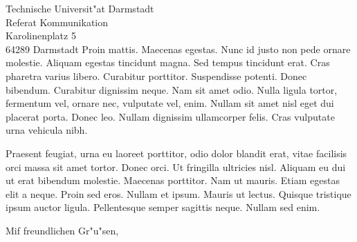 \documentclass[adr=clemens,accentcolor=tud9c,twoside]{tudletter}
\begin{document}
\begin{letter}{%
    Technische Universit"at Darmstadt\\%
    Referat Kommunikation\\%
    Karolinenplatz 5\\%
    64289 Darmstadt}
    Proin mattis. Maecenas egestas. Nunc id justo non pede ornare molestie. Aliquam egestas
    tincidunt magna. Sed tempus tincidunt erat. Cras pharetra varius libero. Curabitur porttitor.
    Suspendisse potenti. Donec bibendum. Curabitur dignissim neque. Nam sit amet odio. Nulla ligula
    tortor, fermentum vel, ornare nec, vulputate vel, enim. Nullam sit amet nisl eget dui placerat
    porta. Donec leo. Nullam dignissim ullamcorper felis. Cras vulputate urna vehicula nibh.
    
    Praesent feugiat, urna eu laoreet porttitor, odio dolor blandit erat, vitae facilisis orci
    massa sit amet tortor. Donec orci. Ut fringilla ultricies nisl. Aliquam eu dui ut erat bibendum
    molestie. Maecenas porttitor. Nam ut mauris. Etiam egestas elit a neque. Proin sed eros. Nullam
    et ipsum. Mauris ut lectus. Quisque tristique ipsum auctor ligula. Pellentesque semper sagittis
    neque. Nullam sed enim.

  \closing{Mif freundlichen Gr"u"sen,}
\end{letter}
\end{document}
